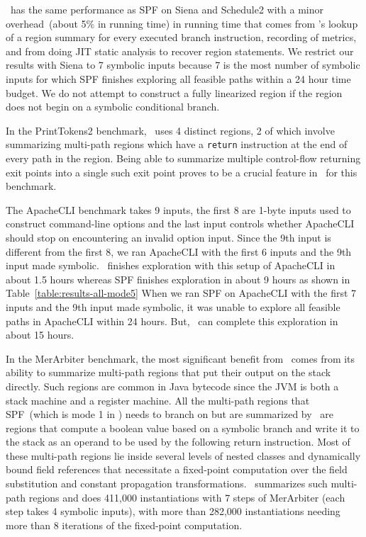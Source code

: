 \tool\ has the same performance as SPF on Siena and Schedule2 with a minor overhead~(about 5\% in running time) in
running time that comes from \tool\rq s lookup of a region summary for every executed branch instruction, recording of
metrics, and from doing JIT static analysis to recover region statements.
%
We restrict our results with Siena to 7 symbolic inputs because 7 is the most number of symbolic inputs for which
SPF finishes exploring all feasible paths within a 24 hour time budget.
%
We do not attempt to construct a fully linearized region if the region does not begin on a symbolic conditional
branch.

In the PrintTokens2 benchmark, \tool\ uses 4 distinct regions, 2 of which involve summarizing multi-path regions which
have a {\tt return} instruction at the end of every path in the region.
%
Being able to summarize multiple control-flow returning exit points into a single such exit point proves to be a crucial
feature in \tool\ for this benchmark.

The ApacheCLI benchmark takes 9 inputs, the first 8 are 1-byte inputs used to construct command-line options and
the last input controls whether ApacheCLI should stop on encountering an invalid option input.
%
Since the 9th input is different from the first 8, we ran ApacheCLI with the first 6 inputs and the 9th input
made symbolic.
%
\tool\ finishes exploration with this setup of ApacheCLI in about 1.5 hours whereas SPF finishes exploration in about 9
hours as shown in Table~\ref{table:results-all-mode5}
%
When we ran SPF on ApacheCLI with the first 7 inputs and the 9th input made symbolic, it was unable to explore all
feasible paths in ApacheCLI within 24 hours.
%
But, \tool\ can complete this exploration in about 15 hours.

In the MerArbiter benchmark, the most significant benefit from \tool\ comes from its ability to summarize multi-path
regions that put their output on the stack directly.
%
Such regions are common in Java bytecode since the JVM is both a stack machine and a register machine.
%
All the multi-path regions that SPF~(which is mode 1 in \tool) needs to branch on but are summarized by \tool\ are
regions that compute a boolean value based on a symbolic branch and write it to the stack as an operand to be used
by the following return instruction.
%
Most of these multi-path regions lie inside several levels of nested classes and dynamically bound field references
that necessitate a fixed-point computation over the field substitution and constant propagation transformations.
%
\tool\ summarizes such multi-path regions and does 411,000 instantiations with 7 steps of MerArbiter (each step takes 4
symbolic inputs), with more than 282,000 instantiations needing more than 8 iterations of the fixed-point computation.

